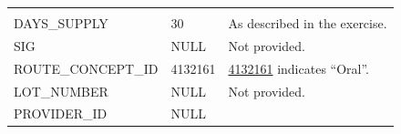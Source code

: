 \documentclass[10.5pt]{book}
\theoremstyle{definition}
\theoremstyle{definition}
\theoremstyle{definition}
\theoremstyle{remark}
\begin{document}
\begin{longtable}[]{@{}lll@{}}
\begin{minipage}[t]{0.48\columnwidth}
\end{minipage}\tabularnewline
\begin{minipage}[t]{0.28\columnwidth}\raggedright\strut
DAYS\_SUPPLY\strut
\end{minipage} & \begin{minipage}[t]{0.16\columnwidth}\raggedright\strut
30\strut
\end{minipage} & \begin{minipage}[t]{0.48\columnwidth}\raggedright\strut
As described in the exercise.\strut
\end{minipage}\tabularnewline
\begin{minipage}[t]{0.28\columnwidth}\raggedright\strut
SIG\strut
\end{minipage} & \begin{minipage}[t]{0.16\columnwidth}\raggedright\strut
NULL\strut
\end{minipage} & \begin{minipage}[t]{0.48\columnwidth}\raggedright\strut
Not provided.\strut
\end{minipage}\tabularnewline
\begin{minipage}[t]{0.28\columnwidth}\raggedright\strut
ROUTE\_CONCEPT\_ID\strut
\end{minipage} & \begin{minipage}[t]{0.16\columnwidth}\raggedright\strut
4132161\strut
\end{minipage} & \begin{minipage}[t]{0.48\columnwidth}\raggedright\strut
\href{http://athena.ohdsi.org/search-terms/terms/4132161}{4132161}
indicates ``Oral''.\strut
\end{minipage}\tabularnewline
\begin{minipage}[t]{0.28\columnwidth}\raggedright\strut
LOT\_NUMBER\strut
\end{minipage} & \begin{minipage}[t]{0.16\columnwidth}\raggedright\strut
NULL\strut
\end{minipage} & \begin{minipage}[t]{0.48\columnwidth}\raggedright\strut
Not provided.\strut
\end{minipage}\tabularnewline
\begin{minipage}[t]{0.28\columnwidth}\raggedright\strut
PROVIDER\_ID\strut
\end{minipage} & \begin{minipage}[t]{0.16\columnwidth}\raggedright\strut
NULL\strut
\end{minipage} & \begin{minipage}[t]{0.48\columnwidth}\raggedright\strut

\end{minipage}
\end{longtable}
\end{document}
